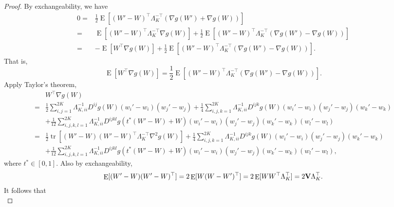 \documentclass[11pt]{article}
\DeclareMathOperator{\mytr}{tr}
\DeclareMathOperator{\myE}{E}
\theoremstyle{plain}
\theoremstyle{definition}
\theoremstyle{remark}
\begin{document}
\begin{appendices}
\begin{proof}
By exchangeability, we have
\begin{equation*}
    \begin{split}
        0=&\frac 1 2 \myE [(W'-W)^\top \Lambda_K^{-\top} (\nabla g(W') +\nabla g(W))]
        \\
        =& \myE [(W'-W)^\top \Lambda_K^{-\top} \nabla g(W)]
        +\frac{1}{2} \myE [(W'-W)^\top \Lambda_K^{-\top} (\nabla g(W') -\nabla g(W))]
        \\
        =&
        - \myE [W^\top  \nabla g(W)]
        +\frac{1}{2} \myE [(W'-W)^\top \Lambda_K^{-\top} (\nabla g(W') -\nabla g(W))].
    \end{split}
\end{equation*}
That is,
\begin{equation*}
         \myE [W^\top  \nabla g(W)]
         =
        \frac{1}{2} \myE [(W'-W)^\top \Lambda_K^{-\top} (\nabla g(W') -\nabla g(W))].
\end{equation*}
Apply Taylor's theorem,
\begin{equation}
    \begin{split}
         &W^\top  \nabla g(W)
         \\
         =&
         \frac 1 2 \sum_{i,j=1}^{2K}
         \Lambda_{K,ii}^{-1} D^{ij} g(W) (w_i'-w_i) (w_j'-w_j)
         +
         \frac 1 4 \sum_{i,j,k=1}^{2K}
         \Lambda_{K,ii}^{-1} D^{ijk} g(W) (w_i'-w_i) (w_j'-w_j)(w_k'-w_k)
         \\
         &+
         \frac{1}{12} \sum_{i,j,k,l=1}^{2K}
         \Lambda_{K,ii}^{-1} D^{ijkl} g(t^*(W'-W)+W) (w_i'-w_i) (w_j'-w_j)(w_k'-w_k) (w_l'-w_l)
         \\
         =&
         \frac 1 2 
         \mytr
         [
         (W'-W)
         (W'-W)^\top \Lambda_K^{-\top} \nabla^2 g(W)
     ]
         +
         \frac 1 4 \sum_{i,j,k=1}^{2K}
         \Lambda_{K,ii}^{-1} D^{ijk} g(W) (w_i'-w_i) (w_j'-w_j)(w_k'-w_k)
         \\
         &+
         \frac{1}{12} \sum_{i,j,k,l=1}^{2K}
         \Lambda_{K,ii}^{-1} D^{ijkl} g(t^*(W'-W)+W) (w_i'-w_i) (w_j'-w_j)(w_k'-w_k) (w_l'-w_l),
    \end{split}
\end{equation}
where $t^*\in [0,1]$.
Also by exchangeability,
\begin{equation*}
    \myE[(W'-W) (W'-W)^\top] 
    =
    2\myE[ W(W-W')^\top] 
    =
    2\myE[ W W^\top \Lambda_K^\top] 
    =2\BV \Lambda_K^\top.
\end{equation*}
It follows that
\begin{equation*}

\end{equation*}
\end{proof}
\end{appendices}
\end{document}
